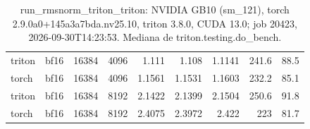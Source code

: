 \begin{table}[htbp]
\begin{tabular}{llrrrrrrr}
    triton & bf16 & 16384 & 4096 & 1.111 & 1.108 & 1.1141 & 241.6 & 88.5 \\
    torch & bf16 & 16384 & 4096 & 1.1561 & 1.1531 & 1.1603 & 232.2 & 85.1 \\
    triton & bf16 & 16384 & 8192 & 2.1422 & 2.1399 & 2.1504 & 250.6 & 91.8 \\
    torch & bf16 & 16384 & 8192 & 2.4075 & 2.3972 & 2.422 & 223 & 81.7 \\
    \bottomrule
  \end{tabular}
  \caption{run\_rmsnorm\_triton\_triton: NVIDIA GB10 (sm\_121), torch 2.9.0a0+145a3a7bda.nv25.10, triton 3.8.0, CUDA 13.0; job 20423, 2026-09-30T14:23:53. Mediana de triton.testing.do\_bench.}
  \label{tab:run-rmsnorm}
\end{table}
